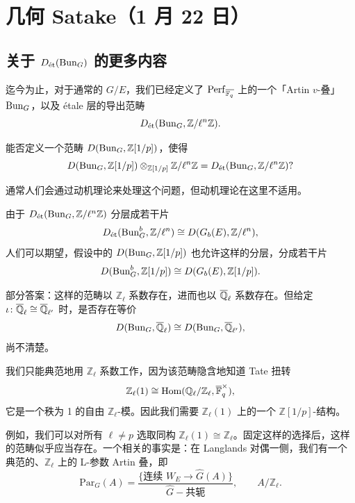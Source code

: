 \section[几何 Satake]{几何 Satake（1 月 22 日）}


\subsection{关于 $D_{\text{ét}}(\mathrm{Bun}_G)$ 的更多内容}

迄今为止，对于通常的 $G/E$，我们已经定义了 $\mathrm{Perf}_{\overline{\mathbb{F}_q}}$ 上的一个「Artin $v$-叠」$\mathrm{Bun}_G$，以及 étale 层的导出范畴
\[
D_{\text{ét}}(\mathrm{Bun}_G,\mathbb Z/\ell^n\mathbb Z).
\]

\begin{question}[Drinfeld]
能否定义一个范畴 $D(\mathrm{Bun}_G,\mathbb Z[1/p])$，使得
\[
D(\mathrm{Bun}_G,\mathbb Z[1/p])\otimes_{\mathbb Z[1/p]}\mathbb Z/\ell^n\mathbb Z=D_{\text{ét}}(\mathrm{Bun}_G,\mathbb Z/\ell^n\mathbb Z)?
\]
\end{question}

通常人们会通过动机理论来处理这个问题，但动机理论在这里不适用。

由于 $D_{\text{ét}}(\mathrm{Bun}_G,\mathbb Z/\ell^n\mathbb Z)$ 分层成若干片
\[
D_{\text{ét}}(\mathrm{Bun}_G^b,\mathbb Z/\ell^n)\cong D(G_b(E),\mathbb Z/\ell^n),
\]
人们可以期望，假设中的 $D(\mathrm{Bun}_G,\mathbb Z[1/p])$ 也允许这样的分层，分成若干片
\[
D(\mathrm{Bun}_G^b,\mathbb Z[1/p])\cong D(G_b(E),\mathbb Z[1/p]).
\]

部分答案：这样的范畴以 $\mathbb Z_\ell$ 系数存在，进而也以 $\overline{\mathbb Q}_\ell$ 系数存在。但给定 $\iota\colon\overline{\mathbb Q}_\ell\cong\overline{\mathbb Q}_{\ell'}$ 时，是否存在等价
\[
D(\mathrm{Bun}_G,\overline{\mathbb Q}_\ell)\cong D(\mathrm{Bun}_G,\overline{\mathbb Q}_{\ell'}),
\]
尚不清楚。

我们只能典范地用 $\mathbb Z_\ell$ 系数工作，因为该范畴隐含地知道 Tate 扭转
\[
\mathbb Z_\ell(1)\cong\operatorname{Hom}(\mathbb Q_\ell/\mathbb Z_\ell,\overline{\mathbb F}_q^\times),
\]
它是一个秩为 1 的自由 $\mathbb Z_\ell$-模。因此我们需要 $\mathbb Z_\ell(1)$ 上的一个 $\mathbb Z[1/p]$-结构。

例如，我们可以对所有 $\ell\neq p$ 选取同构 $\mathbb Z_\ell(1)\cong\mathbb Z_\ell$。固定这样的选择后，这样的范畴似乎应当存在。一个相关的事实是：在 Langlands 对偶一侧，我们有一个典范的、$\mathbb Z_\ell$ 上的 L-参数 Artin 叠，即
\[
\mathrm{Par}_G(A)=\frac{\{\text{连续 }W_E\to\widehat G(A)\}}{\widehat G-\text{共轭}},\qquad A/\mathbb Z_\ell.
\]

